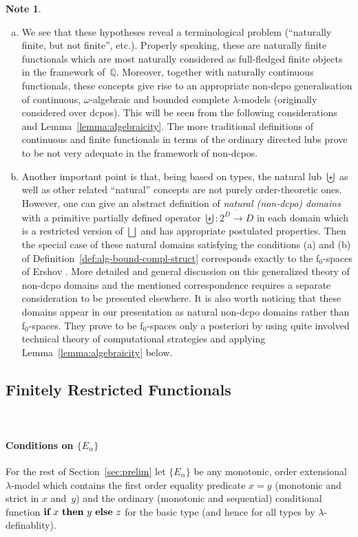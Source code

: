 \documentclass[fleqn]{LMCS}
\theoremstyle{plain}\newtheorem{satz}[thm]{Satz}
\theoremstyle{plain}\newtheorem{hyp}[thm]{Hypothesis}
\theoremstyle{plain}\newtheorem{hyps}[thm]{Hypotheses}
\theoremstyle{definition}\newtheorem{note}[thm]{Note}
\newcommand{\fo}{f$_0$}
\newcommand{\setof}[1]{\{#1\}}
\newcommand{\pointwiselub}{\biguplus}
\newcommand{\arr}{\rightarrow}
\newcommand{\bbQ}{\mathbb{Q}}
\newcommand{\IF}{\mbox{\bf if}}
\newcommand{\THEN}{\mbox{\bf then}}
\newcommand{\ELSE}{\mbox{\bf else}}
\newcommand{\fla}[1]{$#1$}
\newcommand{\?}{\mbox{?}}
\begin{document}
\begin{note}\hfill
\begin{enumerate}[(a)]
\item We see that these hypotheses reveal a terminological problem 
(``naturally finite, but not finite'', etc.). Properly speaking, 
these are naturally finite functionals which are most naturally 
considered as full-fledged finite objects in the framework of~$\bbQ$. 
Moreover, together with naturally continuous functionals, these concepts 
give rise to an appropriate non-dcpo generalisation 
of continuous, $\omega$-algebraic and bounded complete $\lambda$-models 
(originally considered over dcpos). 
This will be seen from the following considerations and 
Lemma~\ref{lemma:algebraicity}. 
The more traditional definitions of continuous and finite functionals in terms 
of the ordinary directed lubs prove to be not very adequate 
in the framework of non-dcpos. 

\item Another important point is that, being based on types, the natural lub 
\fla{\pointwiselub} as well as other related ``natural'' 
concepts are not purely order-theoretic ones. 
However, 
one can give an abstract definition of \emph{natural (non-dcpo) domains} 
with a primitive partially defined operator 
$\pointwiselub:2^D\mathrel{\dot{\arr}}D$ in each domain which is 
a restricted version of $\bigsqcup$ and has appropriate postulated properties. 
Then the special case of these natural domains satisfying 
the conditions (a) and (b) of Definition~\ref{def:alg-bound-compl-struct} 
corresponds exactly to the \fo-spaces of Ershov \cite{Ershov72}. 
More detailed and general discussion on this generalized theory 
of non-dcpo domains and the mentioned correspondence requires 
a separate consideration to be presented elsewhere. 
It is also worth noticing that these domains appear in our presentation as 
natural non-dcpo domains rather than \fo-spaces. They prove to be 
\fo-spaces only a posteriori by using quite involved technical theory 
of computational strategies and applying Lemma~\ref{lemma:algebraicity} below.
\end{enumerate}
\end{note}

\subsection{Finitely Restricted Functionals} \ \ 


\paragraph*{\bf Conditions on $\setof{E_{\alpha}}$} 
For the rest of Section~\ref{sec:prelim} 
let $\setof{E_{\alpha}}$ be any monotonic, order extensional 
$\lambda$-model which contains the first order 
equality predicate $x=y$ 
(monotonic and strict in $x$ and~$y$) 
and the ordinary (monotonic and sequential) 
conditional function $\IF\ x\ \THEN\ y\ \ELSE\ z$ 
for the basic type (and hence for all types by $\lambda$-definablity). 
\end{document}
